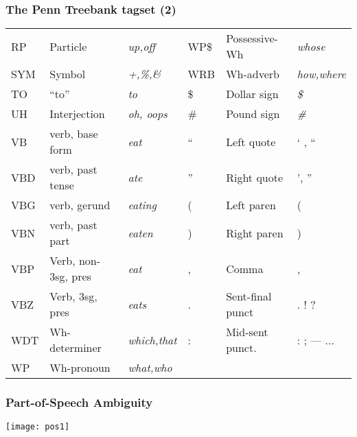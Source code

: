 \begin{frame}[fragile]\frametitle{The Penn Treebank tagset (2)}
  \textcolor{black}{\footnotesize
    \begin{tabular}{|lll|lll|}
      \hline
      RP & Particle & \emph{up,off} &
      WP\$ & Possessive-Wh & \emph{whose} \\ 
      SYM & Symbol & \emph{+,\%,\&}  &
      WRB & Wh-adverb & \emph{how,where} \\
      TO & ``to'' & \emph{to} &
      \$ & Dollar sign & \emph{\$}\\
      UH & Interjection & \emph{oh, oops} &
      \# & Pound sign & \emph{\#} \\
      VB & verb, base form &     \emph{eat} &
      `` & Left quote & ` , `` \\
      VBD & verb, past tense & \emph{ate} &
      '' & Right quote & ', '' \\
      VBG & verb, gerund & \emph{eating} &
      ( & Left paren & ( \\
      VBN & verb, past part & \emph{eaten} &
      ) & Right paren & ) \\
      VBP & Verb, non-3sg, pres & \emph{eat} &
      , & Comma & , \\
      VBZ & Verb, 3sg, pres & \emph{eats} &
      . & Sent-final punct & . ! ? \\
      WDT & Wh-determiner &  \emph{which,that} &
      : & Mid-sent punct. & : ; --- ... \\
      WP & Wh-pronoun & \emph{what,who} & & & \\
      \hline
    \end{tabular}
  }
\end{frame}

\begin{frame}[fragile]\frametitle{Part-of-Speech Ambiguity}

\begin{center}
\texttt{[image: pos1]}
\end{center}
  
\end{frame}


